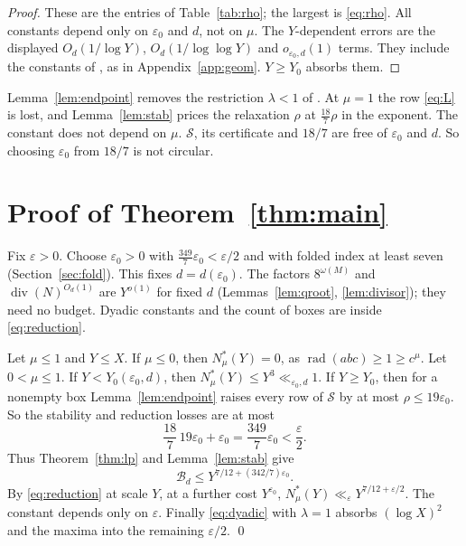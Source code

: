 \documentclass{amsart}
\numberwithin{equation}{section}
\numberwithin{table}{section}
\newcommand{\rad}{\operatorname{rad}}
\begin{document}
\begin{proof}
These are the entries of Table~\ref{tab:rho}; the largest is \eqref{eq:rho}. All
constants depend only on $\varepsilon_0$ and $d$, not on $\mu$. The
$Y$-dependent errors are the displayed $O_d(1/\log Y)$,
$O_d(1/\log\log Y)$ and $o_{\varepsilon_0,d}(1)$ terms. They include the
constants of \cite[Propositions~3.1, 4.1]{BBLT}, as in
Appendix~\ref{app:geom}. $Y\ge Y_0$ absorbs them.


\end{proof}

Lemma~\ref{lem:endpoint} removes the restriction $\lambda<1$ of
\cite[Theorem~1.3]{BBLT}. At $\mu=1$ the row \eqref{eq:L} is lost, and
Lemma~\ref{lem:stab} prices the relaxation $\rho$ at $\tfrac{18}{7}\rho$ in the
exponent. The constant does not depend on $\mu$. $\mathcal S$, its
certificate and $18/7$ are free of $\varepsilon_0$ and $d$. So choosing
$\varepsilon_0$ from $18/7$ is not circular.

\section{Proof of Theorem~\ref{thm:main}}\label{sec:proof}

Fix $\varepsilon>0$. Choose $\varepsilon_0>0$ with
$\tfrac{349}{7}\varepsilon_0<\varepsilon/2$ and with folded index at least
seven (Section~\ref{sec:fold}). This fixes $d=d(\varepsilon_0)$. The factors
$8^{\omega(M)}$ and $\operatorname{div}(N)^{O_d(1)}$ are $Y^{o(1)}$ for fixed $d$
(Lemmas~\ref{lem:qroot}, \ref{lem:divisor}); they need no budget. Dyadic
constants and the count of boxes are inside \eqref{eq:reduction}.

Let $\mu\le1$ and $Y\le X$. If $\mu\le0$, then $N^*_\mu(Y)=0$, as
$\rad(abc)\ge1\ge c^\mu$. Let $0<\mu\le1$. If $Y<Y_0(\varepsilon_0,d)$, then
$N^*_\mu(Y)\le Y^3\ll_{\varepsilon_0,d}1$. If $Y\ge Y_0$, then for a nonempty
box Lemma~\ref{lem:endpoint} raises every row of $\mathcal S$ by at most
$\rho\le19\varepsilon_0$. So the stability and reduction losses are at most
\[
 \frac{18}{7}\,19\varepsilon_0+\varepsilon_0
 =\frac{349}{7}\varepsilon_0
 <\frac\varepsilon2.
\]
Thus Theorem~\ref{thm:lp} and Lemma~\ref{lem:stab} give
\begin{equation}\label{eq:boxbound}
 \mathcal B_d\le Y^{7/12+(342/7)\varepsilon_0} .
\end{equation}
By \eqref{eq:reduction} at scale $Y$, at a further cost $Y^{\varepsilon_0}$,
$N^*_\mu(Y)\ll_\varepsilon Y^{7/12+\varepsilon/2}$. The constant depends only
on $\varepsilon$. Finally \eqref{eq:dyadic} with $\lambda=1$ absorbs
$(\log X)^2$ and the maxima into the remaining $\varepsilon/2$.
\qed
\end{document}
